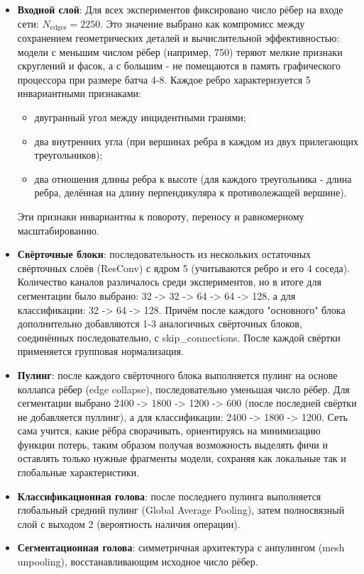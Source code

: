 \begin{itemize}
    \item \textbf{Входной слой}: Для всех экспериментов фиксировано число рёбер на входе сети: $N_{\text{edges}} = 2250$. Это значение выбрано как компромисс между сохранением геометрических деталей и вычислительной эффективностью: модели с меньшим числом рёбер (например, 750) теряют мелкие признаки скруглений и фасок, а с большим - не помещаются в память графического процессора при размере батча 4-8. Каждое ребро характеризуется 5 инвариантными признаками: 
        \begin{itemize}
            \item двугранный угол между инцидентными гранями;
            \item два внутренних угла (при вершинах ребра в каждом из двух прилегающих треугольников);
            \item два отношения длины ребра к высоте (для каждого треугольника - длина ребра, делённая на длину перпендикуляра к противолежащей вершине).
        \end{itemize}
        Эти признаки инвариантны к повороту, переносу и равномерному масштабированию.
    \item \textbf{Свёрточные блоки}: последовательность из нескольких остаточных свёрточных слоёв (ResConv) с ядром 5 (учитываются ребро и его 4 соседа). Количество каналов различалось среди экспериментов, но в итоге для сегментации было выбрано: 32 -> 32 -> 64 -> 64 -> 128, а для классификации: 32 -> 64 -> 128. Причём после каждого "основного" блока дополнительно добавляются 1-3 аналогичных свёрточных блоков, соединённых последовательно, с skip\_connections. После каждой свёртки применяется групповая нормализация.
    \item \textbf{Пулинг}: после каждого свёрточного блока выполняется пулинг на основе коллапса рёбер (edge collapse), последовательно уменьшая число рёбер. Для сегментации выбрано 2400 -> 1800 -> 1200 -> 600 (после последней свёртки не добавляется пуллинг), а для классификации: 2400 -> 1800 -> 1200. Сеть сама учится, какие рёбра сворачивать, ориентируясь на минимизацию функции потерь, таким образом получая возможность выделять фичи и оставлять только нужные фрагменты модели, сохраняя как локальные так и глобальные характеристики.
    \item \textbf{Классификационная голова}: после последнего пулинга выполняется глобальный средний пулинг (Global Average Pooling), затем полносвязный слой с выходом 2 (вероятность наличия операции).
    \item \textbf{Сегментационная голова}: симметричная архитектура с анпулингом (mesh unpooling), восстанавливающим исходное число рёбер.
\end{itemize}

